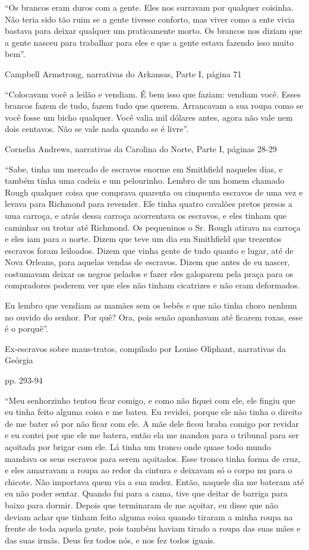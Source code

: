 ``Os brancos eram duros com a gente. Eles nos surravam por qualquer
coisinha. Não teria sido tão ruim se a gente tivesse conforto, mas viver
como a ente vivia bastava para deixar qualquer um praticamente morto. Os
brancos nos diziam que a gente nasceu para trabalhar para eles e que a
gente estava fazendo isso muito bem''.

Campbell Armstrong, narrativas do Arkansas, Parte I, página 71

``Colocavam você a leilão e vendiam. É bem isso que faziam: vendiam
você. Esses brancos fazem de tudo, fazem tudo que querem. Arrancavam a
sua roupa como se você fosse um bicho qualquer. Você valia mil dólares
antes, agora não vale nem dois centavos. Não se vale nada quando se é
livre''.

Cornelia Andrews, narrativas da Carolina do Norte, Parte I, páginas
28-29

``Sabe, tinha um mercado de escravos enorme em Smithfield naqueles dias,
e também tinha uma cadeia e um pelourinho. Lembro de um homem chamado
Rough qualquer coisa que comprava quarenta ou cinquenta escravos de uma
vez e levava para Richmond para revender. Ele tinha quatro cavalões
pretos presos a uma carroça, e atrás dessa carroça acorrentava os
escravos, e eles tinham que caminhar ou trotar até Richmond. Os
pequeninos o Sr. Rough atirava na carroça e eles iam para o norte. Dizem
que teve um dia em Smithfield que trezentos escravos foram leiloados.
Dizem que vinha gente de tudo quanto e lugar, até de Nova Orleans, para
aquelas vendas de escravos. Dizem que antes de eu nascer, costumavam
deixar os negros pelados e fazer eles galoparem pela praça para os
compradores poderem ver que eles não tinham cicatrizes e não eram
deformados.

Eu lembro que vendiam as mamães sem os bebês e que não tinha choro
nenhum no ouvido do senhor. Por quê? Ora, pois senão apanhavam até
ficarem roxas, esse é o porquê''.

Ex-escravos sobre maus-tratos, compilado por Louise Oliphant, narrativas
da Geórgia

pp. 293-94

``Meu senhorzinho tentou ficar comigo, e como não fiquei com ele, ele
fingiu que eu tinha feito alguma coisa e me bateu. Eu revidei, porque
ele não tinha o direito de me bater só por não ficar com ele. A mãe dele
ficou braba comigo por revidar e eu contei por que ele me batera, então
ela me mandou para o tribunal para ser açoitada por brigar com ele. Lá
tinha um tronco onde quase todo mundo mandava os seus escravos para
serem açoitados. Esse tronco tinha forma de cruz, e eles amarravam a
roupa ao redor da cintura e deixavam só o corpo nu para o chicote. Não
importava quem via a sua nudez. Então, naquele dia me bateram até eu não
poder sentar. Quando fui para a cama, tive que deitar de barriga para
baixo para dormir. Depois que terminaram de me açoitar, eu disse que não
deviam achar que tinham feito alguma coisa quando tiraram a minha roupa
na frente de toda aquela gente, pois também haviam tirado a roupa das
suas mães e das suas irmãs. Deus fez todos nós, e nos fez todos iguais.

